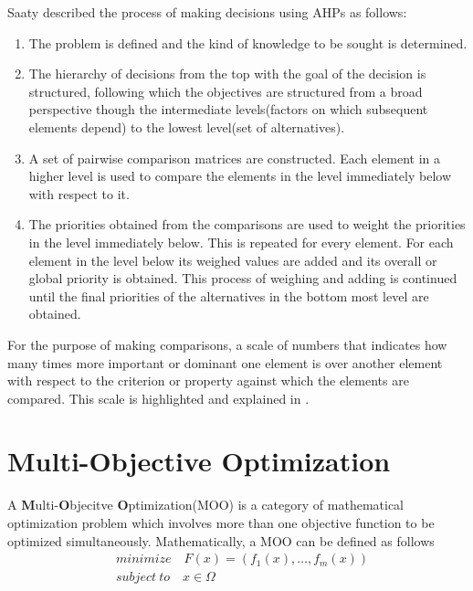 Saaty described the process of making decisions using AHPs as follows:

\begin{enumerate}
    \item The problem is defined and the kind of knowledge to be sought is determined.
    \item The hierarchy of decisions from the top with the goal of the decision is structured, following which the objectives are structured from a broad perspective though the intermediate levels(factors on which subsequent elements depend) to the lowest level(set of alternatives).
    \item A set of pairwise comparison matrices are constructed. Each element in a higher level is used to compare the elements in the level immediately below with respect to it.
    \item The priorities obtained from the comparisons are used to weight the priorities in the level immediately below. This is repeated for every element. For each element in the level below its weighed values are added and its overall or global priority is obtained. This process of weighing and adding is continued until the final priorities of the alternatives in the bottom most level are obtained.
\end{enumerate}


For the purpose of making comparisons, a scale of numbers that indicates how many times more important or dominant one element is over another element with respect to the criterion or property against which the elements are compared. This scale is highlighted and explained in .


\section{Multi-Objective Optimization}
\label{sec:bg:moo}

A \textbf{M}ulti-\textbf{O}bjecitve \textbf{O}ptimization(MOO) is a category of mathematical optimization problem which involves more than one objective function to be optimized simultaneously. Mathematically, a MOO can be defined as follows
\begin{equation}
    \begin{aligned}
        & minimize \quad F(x) = (f_1(x), \ldots ,f_m(x))  \\
        & subject\ to \quad x \in \Omega
    \end{aligned}
    \label{eq:MOO}
\end{equation}


